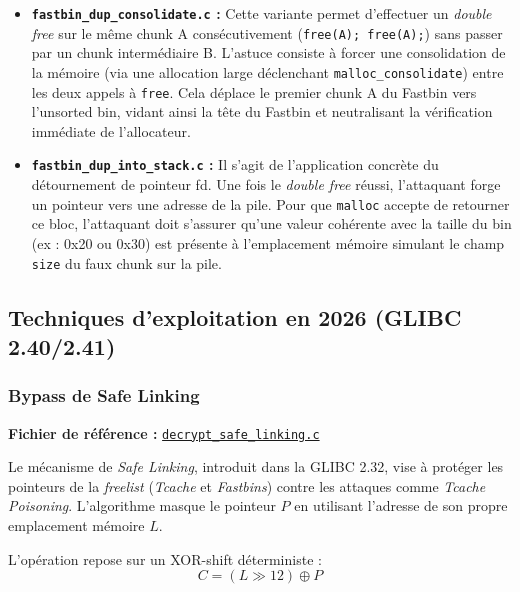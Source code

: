 \begin{itemize}
    \item \textbf{\texttt{fastbin\_dup\_consolidate.c} :} Cette variante permet d'effectuer un \textit{double free} sur le même chunk A consécutivement (\texttt{free(A); free(A);}) sans passer par un chunk intermédiaire B. L'astuce consiste à forcer une consolidation de la mémoire (via une allocation large déclenchant \texttt{malloc\_consolidate}) entre les deux appels à \texttt{free}. Cela déplace le premier chunk A du Fastbin vers l'unsorted bin, vidant ainsi la tête du Fastbin et neutralisant la vérification immédiate de l'allocateur.
    \item \textbf{\texttt{fastbin\_dup\_into\_stack.c} :} Il s'agit de l'application concrète du détournement de pointeur fd. Une fois le \textit{double free} réussi, l'attaquant forge un pointeur vers une adresse de la pile. Pour que \texttt{malloc} accepte de retourner ce bloc, l'attaquant doit s'assurer qu'une valeur cohérente avec la taille du bin (ex : 0x20 ou 0x30) est présente à l'emplacement mémoire simulant le champ \texttt{size} du faux chunk sur la pile.
\end{itemize}

\subsection{Techniques d'exploitation en 2026 (GLIBC 2.40/2.41)}

\subsubsection{Bypass de Safe Linking}

\noindent\textbf{Fichier de référence :} \href{https://github.com/shellphish/how2heap/blob/master/glibc_2.41/decrypt_safe_linking.c}{\texttt{decrypt\_safe\_linking.c}}

Le mécanisme de \textit{Safe Linking}, introduit dans la GLIBC 2.32, vise à protéger les pointeurs de la \textit{freelist} (\textit{Tcache} et \textit{Fastbins}) contre les attaques comme \textit{Tcache Poisoning}. L'algorithme masque le pointeur $P$ en utilisant l'adresse de son propre emplacement mémoire $L$.

L'opération repose sur un XOR-shift déterministe :
$$C = (L \gg 12) \oplus P$$

